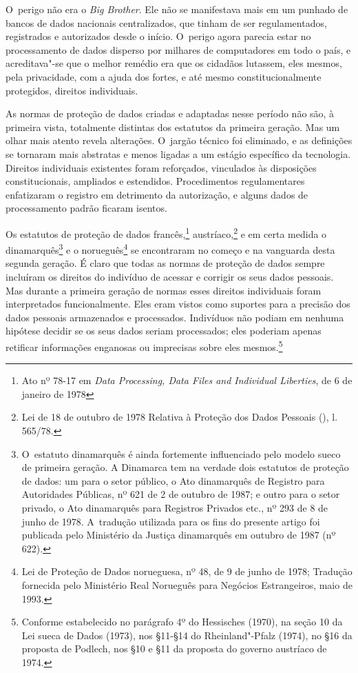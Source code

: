 O~perigo não era o \emph{Big Brother}. Ele não se manifestava mais em um
punhado de bancos de dados nacionais centralizados, que tinham de ser
regulamentados, registrados e autorizados desde o início. O~perigo agora
parecia estar no processamento de dados disperso por milhares de
computadores em todo o país, e acreditava"-se que o melhor remédio era
que os cidadãos lutassem, eles mesmos, pela privacidade, com a ajuda dos
fortes, e até mesmo constitucionalmente protegidos, direitos
individuais.

As normas de proteção de dados criadas e adaptadas nesse período não
são, à primeira vista, totalmente distintas dos estatutos da primeira
geração. Mas um olhar mais atento revela alterações. O~jargão técnico
foi eliminado, e as definições se tornaram mais abstratas e menos
ligadas a um estágio específico da tecnologia. Direitos individuais
existentes foram reforçados, vinculados às disposições constitucionais,
ampliados e estendidos. Procedimentos regulamentares enfatizaram o
registro em detrimento da autorização, e alguns dados de processamento
padrão ficaram isentos.

Os estatutos de proteção de dados francês,\footnote{Ato nº 78-17 em
  \emph{Data Processing, Data Files and Individual Liberties}, de 6 de
  janeiro de 1978} austríaco,\footnote{Lei de 18 de outubro de 1978
  Relativa à Proteção dos Dados Pessoais (), l. 565/78.} e em
certa medida o dinamarquês\footnote{O~estatuto dinamarquês é ainda
  fortemente influenciado pelo modelo sueco de primeira geração. A
  Dinamarca tem na verdade dois estatutos de proteção de dados: um para
  o setor público, o Ato dinamarquês de Registro para Autoridades
  Públicas, nº 621 de 2 de outubro de 1987; e outro para o setor
  privado, o Ato dinamarquês para Registros Privados etc., nº 293 de 8
  de junho de 1978. A~tradução utilizada para os fins do presente artigo
  foi publicada pelo Ministério da Justiça dinamarquês em outubro de
  1987 (nº 622).} e o norueguês\footnote{Lei de Proteção de Dados
  norueguesa, nº 48, de 9 de junho de 1978; Tradução fornecida pelo
  Ministério Real Norueguês para Negócios Estrangeiros, maio de 1993.}
se encontraram no começo e na vanguarda desta segunda geração. É claro
que todas as normas de proteção de dados sempre incluíram os direitos do
indivíduo de acessar e corrigir os seus dados pessoais. Mas durante a
primeira geração de normas esses direitos individuais foram
interpretados funcionalmente. Eles eram vistos como suportes para a
precisão dos dados pessoais armazenados e processados. Indivíduos não
podiam em nenhuma hipótese decidir se os seus dados seriam processados;
eles poderiam apenas retificar informações enganosas ou imprecisas sobre
eles mesmos.\footnote{Conforme estabelecido no parágrafo 4º do
  Hessisches  (1970), na seção 10 da Lei sueca de Dados (1973), nos
  §11-§14 do  Rheinland"-Pfalz (1974), no §16 da proposta de Podlech,
  nos §10 e §11 da proposta do governo austríaco de 1974.}

